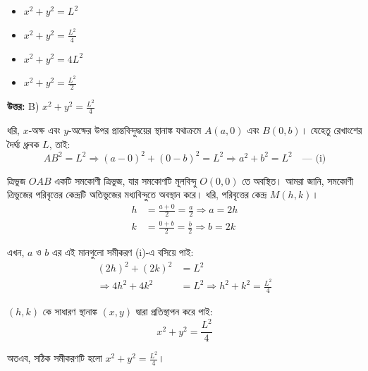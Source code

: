\documentclass[12pt, a4paper]{article}
\begin{document}
\begin{itemize}[label={}, leftmargin=1cm, itemsep=0.5em]
    \item[\textbf{A)}] $x^2 + y^2 = L^2$
    \item[\textbf{B)}] $x^2 + y^2 = \frac{L^2}{4}$
    \item[\textbf{C)}] $x^2 + y^2 = 4L^2$
    \item[\textbf{D)}] $x^2 + y^2 = \frac{L^2}{2}$
\end{itemize}

\vspace{0.5em}
\begin{tcolorbox}[answerbox]
    \textbf{\color{success} উত্তর:} B) $x^2 + y^2 = \frac{L^2}{4}$
\end{tcolorbox}
\vspace{1em}

\begin{tcolorbox}[solutionbox={সমাধান (Solution)}]
    \noindent
    ধরি, $x$-অক্ষ এবং $y$-অক্ষের উপর প্রান্তবিন্দুদ্বয়ের স্থানাঙ্ক যথাক্রমে $A(a, 0)$ এবং $B(0, b)$। যেহেতু রেখাংশের দৈর্ঘ্য ধ্রুবক $L$, তাই:
    \[ AB^2 = L^2 \Rightarrow (a - 0)^2 + (0 - b)^2 = L^2 \Rightarrow a^2 + b^2 = L^2 \quad \text{--- (i)} \]
    
    \vspace{0.5em}
    ত্রিভুজ $OAB$ একটি সমকোণী ত্রিভুজ, যার সমকোণটি মূলবিন্দু $O(0, 0)$ তে অবস্থিত। আমরা জানি, সমকোণী ত্রিভুজের পরিবৃত্তের কেন্দ্রটি অতিভুজের মধ্যবিন্দুতে অবস্থান করে। ধরি, পরিবৃত্তের কেন্দ্র $M(h, k)$।
    \begin{align*}
        h &= \frac{a + 0}{2} = \frac{a}{2} \Rightarrow a = 2h \\
        k &= \frac{0 + b}{2} = \frac{b}{2} \Rightarrow b = 2k
    \end{align*}
    
    \vspace{0.5em}
    এখন, $a$ ও $b$ এর এই মানগুলো সমীকরণ (i)-এ বসিয়ে পাই:
    \begin{align*}
        (2h)^2 + (2k)^2 &= L^2 \\
        \Rightarrow 4h^2 + 4k^2 &= L^2 \Rightarrow h^2 + k^2 = \frac{L^2}{4}
    \end{align*}
    
    \vspace{0.5em}
    $(h, k)$ কে সাধারণ স্থানাঙ্ক $(x, y)$ দ্বারা প্রতিস্থাপন করে পাই:
    \[ x^2 + y^2 = \frac{L^2}{4} \]
    
    \vspace{0.5em}
    অতএব, সঠিক সমীকরণটি হলো $x^2 + y^2 = \frac{L^2}{4}$।
\end{tcolorbox}
\end{document}
